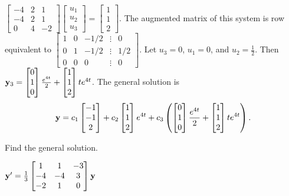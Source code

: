 \documentclass{ximera}
\begin{document}
\begin{problem}
\begin{solution}
$  \begin{bmatrix}-4&2&1\\-4&2&1\\0&4&-2\end{bmatrix} \begin{bmatrix}u_1\\u_2\\u_3\end{bmatrix}=  \begin{bmatrix}1\\1\\2\end{bmatrix}$.
The augmented matrix of this system is row equivalent to
$  \begin{bmatrix}1&0&-1/2&\vdots&0\\0&1&-1/2&
\vdots&1/2\\0&0&0&\vdots&0 \end{bmatrix}$.
Let  $u_3=0$, $u_1=0$, and $u_2=\frac{1 }{2}$. Then
${\bf
y}_3=  \begin{bmatrix}0\\1\\0\end{bmatrix}\frac{e^{4t} }{2}+  \begin{bmatrix}1\\1\\2\end{bmatrix}te^{4t}$.
The general solution is
$$
{\bf y}= 
c_1 \begin{bmatrix}-1\\-1\\2\end{bmatrix}+c_2 \begin{bmatrix}1\\1\\2\end{bmatrix}e^{4t}+
c_3\left( \begin{bmatrix}0\\1\\0\end{bmatrix}\frac{e^{4t} }{2}+ \begin{bmatrix}1\\1\\2\end{bmatrix}te^{4t}\right).
$$

\end{solution}
 \end{problem}


 \begin{problem}\label{exer:10.5.9}
 Find the general solution.
 
$ {\bf y}' =\frac{1 }{3} \begin{bmatrix}1&1&-3\\-4&-4&3\\-2&1&0\end{bmatrix}{\bf y}$
 \end{problem}
\end{document}
